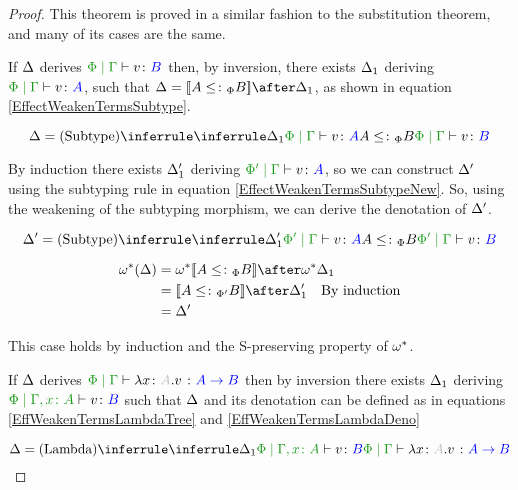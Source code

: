 \documentclass{Report}
\begin{document}
\begin{proof}
    This theorem is proved in a similar fashion to the substitution theorem, and many of its cases are the same.


    If $\Delta$ derives $\gpetyperelation{v}{B}$ then, by inversion, there exists $\Delta_1$ deriving $\gpetyperelation{v}{A}$, such that $ \D = \deno{A\subtypep B}\after \D_1$, as shown in equation \ref{EffectWeakenTermsSubtype}.

    \begin{equation}
        \label{EffectWeakenTermsSubtype}
        \D = \ntreeruleII{Subtype}{\treeruleI{\D_1}{\gpetyperelation{v}{A}}}{ A \subtypep B}{\gpetyperelation{v}{B}}
    \end{equation}

    By induction there exists $\Delta_1'$ deriving $\etyperelation{\P'}{\G}{v}{A}$, so we can construct $\Delta'$ using the subtyping rule in equation \ref{EffectWeakenTermsSubtypeNew}.
    So, using the weakening of the subtyping morphism, we can derive the denotation of $\Delta'$.

    \begin{equation}
        \label{EffectWeakenTermsSubtypeNew}
        \D' = \ntreeruleII{Subtype}{\treeruleI{\D_1'}{\etyperelation{\P'}{\G}{v}{A}}}{A \subtypep B}{\etyperelation{\P'}{\G}{v}{B}}
    \end{equation}

    \begin{align*}
        \w\star(\D) & = \w\star{\deno{A\subtypep B}}\after\w\star\D_1 \\
        & = \deno{A\subtypepp B}\after\D_1'\qt{By induction}\\
        & = \D'
    \end{align*}
    
    This case holds by induction and the S-preserving property of $\omega^*$.

    If $\Delta$ derives $\gpetyperelation{\lam{x}{A}{v}}{\ab}$ then by inversion there exists $\Delta_1$ deriving $\etyperelation{\P}{\gax}{v}{B}$ such that $\Delta$ and its denotation can be defined as in equations \ref{EffWeakenTermsLambdaTree} and \ref{EffWeakenTermsLambdaDeno}
    

    \begin{equation}
        \label{EffWeakenTermsLambdaTree}
        \D = \ntreeruleI{Lambda}{
            \treeruleI{\D_1}{\etyperelation{\P}{\gax}{v}{B}}
        }{\gpetyperelation{\lam{x}{A}{v}}{\ab}}
    \end{equation}



\end{proof}
\end{document}

